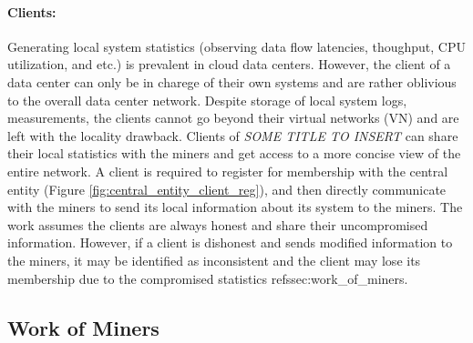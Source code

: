 \documentclass{article}
\newcommand{\projTitle}{SOME TITLE TO INSERT}
\begin{document}
\paragraph{Clients:} Generating local system statistics (observing data flow latencies, thoughput, CPU utilization, and etc.) is prevalent in cloud data centers. However, the client of a data center can only be in charege of their own systems and are rather oblivious to the overall data center network. Despite storage of local system logs, measurements, the clients cannot go beyond their virtual networks (VN) and are left with the locality drawback. Clients of \textit{\projTitle} can share their local statistics with the miners and get access to a more concise view of the entire network. A client is required to register for membership with the central entity (Figure \ref{fig:central_entity_client_reg}), and then directly communicate with the miners to send its local information about its system to the miners. The work assumes the clients are always honest and share their uncompromised information. However, if a client is dishonest and sends modified information to the miners, it may be identified as inconsistent and the client may lose its membership due to the compromised statistics ref{ssec:work_of_miners}.     
\par       



\subsection{Work of Miners}\label{ssec:work_of_miners}


     
\newpage


\end{document}
